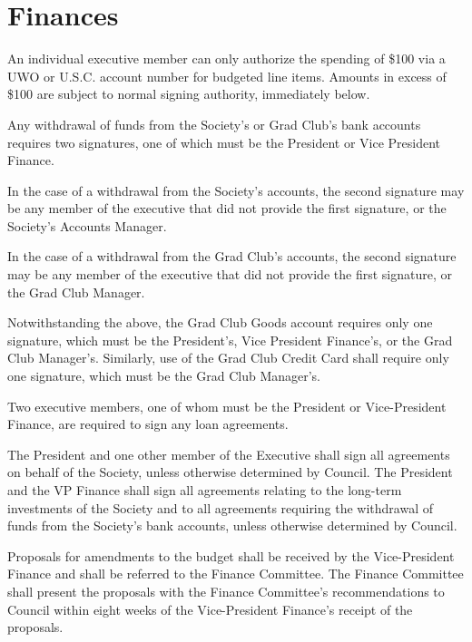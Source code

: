 \section{Finances}
\begin{longenum}[ label*=\thesection.\arabic*., align=left]
	\item An individual executive member can only authorize the spending of \$100 via a  UWO or U.S.C. account number for budgeted line items. Amounts in excess of \$100 are subject to normal signing authority, immediately below.
    \item Any withdrawal of funds from the Society's or Grad Club's bank accounts requires two signatures, one of which must be the President or Vice  President Finance.
    \begin{longenum}[ label*=\arabic*., align=left]
    	\item In the case of a withdrawal from the Society's accounts, the second signature may be any member of the executive that did not provide the first signature, or the Society's Accounts Manager. 
        \item In the case of a withdrawal from the Grad Club's accounts, the second signature may be any member of the executive that did not provide the first signature, or the Grad Club Manager.
    \end{longenum}
    \item Notwithstanding the above, the Grad Club Goods account requires only one signature, which must be the President's, Vice President Finance's, or the Grad Club Manager's. Similarly, use of the Grad Club Credit Card shall require only one signature, which must be the Grad Club Manager's. 
    \item Two executive members, one of whom must be the President or Vice-President Finance, are required to sign any loan agreements.
    \item The President and one other member of the Executive shall sign all agreements on behalf of the Society, unless otherwise determined by Council. The President and the VP Finance shall sign all agreements relating to the long-term investments of the Society and to all agreements requiring the withdrawal of funds from the Society's bank accounts, unless otherwise determined by Council.
    \item Proposals for amendments to the budget shall be received by the Vice-President Finance and shall be referred to the Finance Committee. The Finance Committee shall present the proposals with the Finance Committee's recommendations to Council within eight weeks of the Vice-President Finance's receipt of the proposals.
    

\end{longenum}
